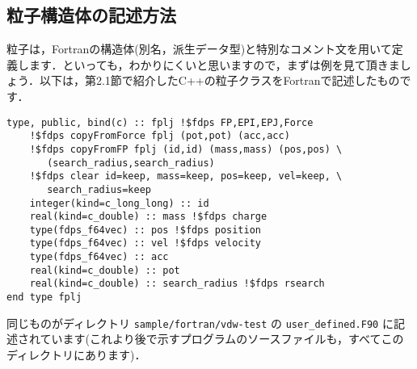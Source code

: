 \documentclass[twocolumn,10pt]{jarticle}
\begin{document}
\subsection{粒子構造体の記述方法}\label{subsec:how_to_implement_ptcl}
粒子は，Fortranの構造体(別名，派生データ型)と特別なコメント文を用いて定義します．といっても，わかりにくいと思いますので，まずは例を見て頂きましょう．以下は，第2.1節で紹介したC++の粒子クラスをFortranで記述したものです．
{\scriptsize
\begin{verbatim}
type, public, bind(c) :: fplj !$fdps FP,EPI,EPJ,Force
    !$fdps copyFromForce fplj (pot,pot) (acc,acc)
    !$fdps copyFromFP fplj (id,id) (mass,mass) (pos,pos) \
       (search_radius,search_radius)
    !$fdps clear id=keep, mass=keep, pos=keep, vel=keep, \
       search_radius=keep
    integer(kind=c_long_long) :: id
    real(kind=c_double) :: mass !$fdps charge
    type(fdps_f64vec) :: pos !$fdps position
    type(fdps_f64vec) :: vel !$fdps velocity
    type(fdps_f64vec) :: acc
    real(kind=c_double) :: pot
    real(kind=c_double) :: search_radius !$fdps rsearch
end type fplj  
\end{verbatim}
}\noindent
同じものがディレクトリ \texttt{sample/fortran/vdw-test} の \texttt{user\_defined.F90} に記述されています(これより後で示すプログラムのソースファイルも，すべてこのディレクトリにあります)．
\end{document}
